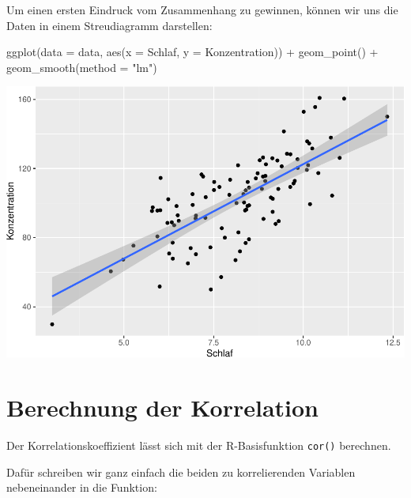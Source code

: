 \documentclass[
]{book}
\newenvironment{Shaded}{\begin{snugshade}}{\end{snugshade}}
\newcommand{\AttributeTok}[1]{\textcolor[rgb]{0.77,0.63,0.00}{#1}}
\newcommand{\FunctionTok}[1]{\textcolor[rgb]{0.00,0.00,0.00}{#1}}
\newcommand{\NormalTok}[1]{#1}
\newcommand{\SpecialCharTok}[1]{\textcolor[rgb]{0.00,0.00,0.00}{#1}}
\newcommand{\StringTok}[1]{\textcolor[rgb]{0.31,0.60,0.02}{#1}}
\begin{document}
Um einen ersten Eindruck vom Zusammenhang zu gewinnen, können wir uns die Daten in einem Streudiagramm darstellen:

\begin{Shaded}
\begin{Highlighting}[]
\FunctionTok{ggplot}\NormalTok{(}\AttributeTok{data =}\NormalTok{ data, }\FunctionTok{aes}\NormalTok{(}\AttributeTok{x =}\NormalTok{ Schlaf, }\AttributeTok{y =}\NormalTok{ Konzentration)) }\SpecialCharTok{+}
  \FunctionTok{geom\_point}\NormalTok{() }\SpecialCharTok{+}
  \FunctionTok{geom\_smooth}\NormalTok{(}\AttributeTok{method =} \StringTok{"lm"}\NormalTok{)}
\end{Highlighting}
\end{Shaded}

\includegraphics{CFH_R_bookdown_files/figure-latex/unnamed-chunk-209-1.pdf}

\hypertarget{berechnung-der-korrelation}{%
\section{Berechnung der Korrelation}\label{berechnung-der-korrelation}}

Der Korrelationskoeffizient lässt sich mit der R-Basisfunktion \texttt{cor()} berechnen.

Dafür schreiben wir ganz einfach die beiden zu korrelierenden Variablen nebeneinander in die Funktion:

\begin{Shaded}
\end{Shaded}
\end{document}
